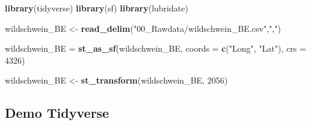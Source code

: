 \documentclass[]{book}
\newenvironment{Shaded}{\begin{snugshade}}{\end{snugshade}}
\newcommand{\KeywordTok}[1]{\textcolor[rgb]{0.13,0.29,0.53}{\textbf{#1}}}
\newcommand{\DataTypeTok}[1]{\textcolor[rgb]{0.13,0.29,0.53}{#1}}
\newcommand{\DecValTok}[1]{\textcolor[rgb]{0.00,0.00,0.81}{#1}}
\newcommand{\StringTok}[1]{\textcolor[rgb]{0.31,0.60,0.02}{#1}}
\newcommand{\NormalTok}[1]{#1}
\begin{document}
\begin{Shaded}
\begin{Highlighting}[]
\KeywordTok{library}\NormalTok{(tidyverse)}
\KeywordTok{library}\NormalTok{(sf)}
\KeywordTok{library}\NormalTok{(lubridate)}

\NormalTok{wildschwein_BE <-}\StringTok{ }\KeywordTok{read_delim}\NormalTok{(}\StringTok{"00_Rawdata/wildschwein_BE.csv"}\NormalTok{,}\StringTok{","}\NormalTok{)}

\NormalTok{wildschwein_BE =}\StringTok{ }\KeywordTok{st_as_sf}\NormalTok{(wildschwein_BE, }\DataTypeTok{coords =} \KeywordTok{c}\NormalTok{(}\StringTok{"Long"}\NormalTok{, }\StringTok{"Lat"}\NormalTok{), }\DataTypeTok{crs =} \DecValTok{4326}\NormalTok{)}

\NormalTok{wildschwein_BE <-}\StringTok{ }\KeywordTok{st_transform}\NormalTok{(wildschwein_BE, }\DecValTok{2056}\NormalTok{)}
\end{Highlighting}
\end{Shaded}

\subsection{Demo Tidyverse}\label{demo-tidyverse-1}
\end{document}
